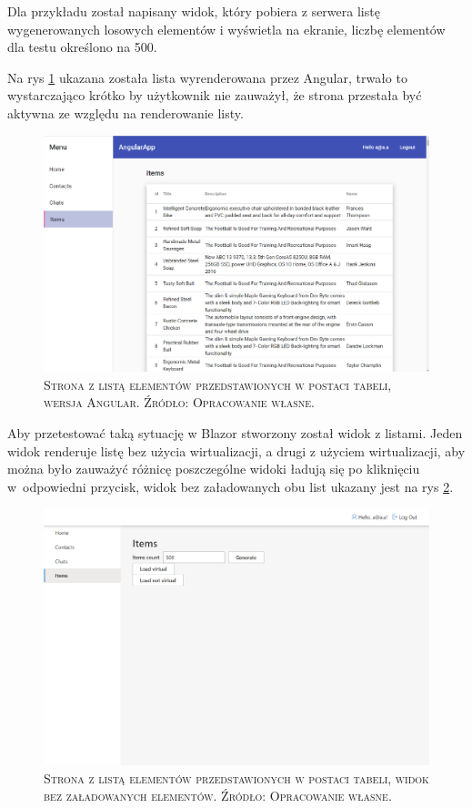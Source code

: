\documentclass[12pt,a4paper,oneside]{book}
\newcommand{\captionT}[1]{\caption{\textsc{\footnotesize{#1}}}}
\begin{document}
Dla przykładu został napisany widok, który pobiera z serwera listę wygenerowanych losowych elementów i wyświetla na ekranie, liczbę elementów dla testu określono na 500.

Na rys \ref{rys_app_angular_list} ukazana została lista wyrenderowana przez Angular, trwało to wystarczająco krótko by użytkownik nie zauważył, że strona przestała być aktywna ze względu na renderowanie listy.

\begin{figure}[H]
\centering
\includegraphics[width=1\textwidth]{images/AngularApp/AngularLista.pdf}
\captionT{Strona z listą elementów przedstawionych w postaci tabeli, wersja Angular. Źródło: Opracowanie własne.}
\label{rys_app_angular_list}
\end{figure}

Aby przetestować taką sytuację w Blazor stworzony został widok z listami. Jeden widok renderuje listę bez użycia wirtualizacji, a drugi z użyciem wirtualizacji, aby można było zauważyć różnicę poszczególne widoki ładują się po kliknięciu w~odpowiedni przycisk, widok bez załadowanych obu list ukazany jest na rys \ref{rys_app_blazor_list_empty}.

\begin{figure}[H]
\centering
\includegraphics[width=1\textwidth]{images/BlazorApp/BlazorListaPusta.pdf}
\captionT{Strona z listą elementów przedstawionych w postaci tabeli, widok bez załadowanych elementów. Źródło: Opracowanie własne.}
\label{rys_app_blazor_list_empty}
\end{figure}
\end{document}
